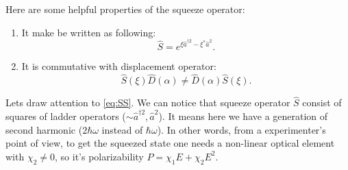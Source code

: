 Here are some helpful properties of the squeeze operator:
\begin{enumerate}
	\item It make be written as following:
	\begin{equation}
		\hat{S} = e^{\xi \hat{a}^{\dagger 2} - \xi^* \hat{a}^2}.
		\label{eq:SS}
	\end{equation}
	\item It is commutative with displacement operator:
	\begin{equation}
		\hat{S} (\xi) \hat{D} (\alpha) \neq  \hat{D} (\alpha) \hat{S} (\xi).
	\end{equation}
\end{enumerate}

Lets draw attention to \eqref{eq:SS}. We can notice that squeeze operator $\hat{S}$ consist of squares of ladder operators ($\sim \hat{a}^{\dagger 2}, \hat{a}^{2}$). It means here we have a generation of second harmonic ($2 \hbar \omega$ instead of $\hbar \omega$). In other words,  from a experimenter's point of view, to get the squeezed state one needs a non-linear optical element with $\chi_2 \neq 0$, so it's polarizability $P = \chi_1 E + \chi_2 E^2$. 



